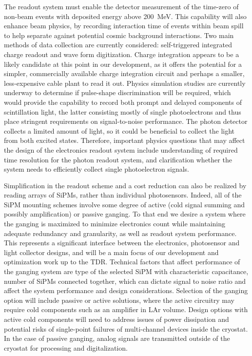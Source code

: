The readout system must enable the detector measurement of the time-zero of non-beam events with deposited 
energy above \SI{200}{MeV}. This capability will also enhance beam physics, by recording interaction time of events within 
beam spill to help separate against potential cosmic background interactions. Two main methods of data collection are currently considered:  self-triggered integrated charge readout and wave form digitization.  Charge integration appears to be a likely candidate at this point in our development, as it offers the potential for a simpler, commercially available charge integration circuit and perhaps a smaller, less-expensive cable plant to read it out.  Physics simulation studies are currently underway to determine if pulse-shape 
discrimination will be required, which would provide the capability to record both prompt and delayed components of scintillation light, the latter consisting mostly 
of single photoelectrons and thus place stringent requirements on signal-to-noise performance. The photon detector collects a limited amount of light, so it could be beneficial to 
collect the light from both excited states. Therefore, important physics questions that may affect the design of the electronics 
readout system include understanding of required time resolution for the photon readout system, and clarification whether 
the system needs to efficiently collect single photoelectron signals. 

Simplification in the readout scheme and a cost reduction can also be realized by reading arrays of SiPMs, rather than individual 
photosensors. Indeed, all of the SiPM mounting schemes involve some degree of active (cold signal summing and possibly amplification) or passive ganging.  To that end we desire a system where the ganging is maximized to minimize electronics count while maintaining adequate redundancy and granularity, as well as readout system performance.  This represents a significant interface between the electronics, photosensor and light collector designs, and will be a main focus of our development and optimization work up to the TDR.
Technical factors that affect performance of the ganging system are type of the selected SiPM with characteristic capacitance, 
number of SiPMs connected together, which can dictate signal to noise ratio and affect the system 
performance and design considerations. Selection of the ganging option will include passive or active solutions, where the active 
circuitry may require cold components such as an amplifier in LAr volume. Design options with active cold components will need 
to address issues of power dissipation and potential risks of single-point failures of multi-channel devices inside the cryostat.
In the case of passive ganging, analog signals are transmitted outside of the cryostat for processing and digitalization. 

